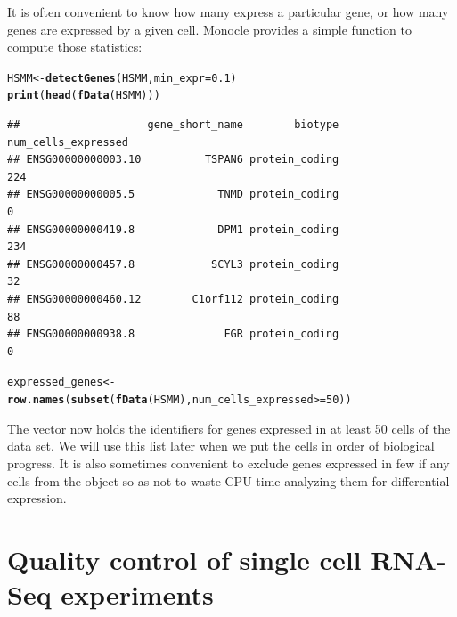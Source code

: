 \documentclass[10pt,oneside]{article}\usepackage[]{graphicx}\usepackage[]{color}
\makeatletter
\newcommand{\hlnum}[1]{\textcolor[rgb]{0.686,0.059,0.569}{#1}}%
\newcommand{\hlopt}[1]{\textcolor[rgb]{0,0,0}{#1}}%
\newcommand{\hlstd}[1]{\textcolor[rgb]{0.345,0.345,0.345}{#1}}%
\newcommand{\hlkwb}[1]{\textcolor[rgb]{0.69,0.353,0.396}{#1}}%
\newcommand{\hlkwc}[1]{\textcolor[rgb]{0.333,0.667,0.333}{#1}}%
\newcommand{\hlkwd}[1]{\textcolor[rgb]{0.737,0.353,0.396}{\textbf{#1}}}%
\newenvironment{kframe}{%
 \def\at@end@of@kframe{}%
 \ifinner\ifhmode%
  \def\at@end@of@kframe{\end{minipage}}%
  \begin{minipage}{\columnwidth}%
 \fi\fi%
 \def\FrameCommand##1{\hskip\@totalleftmargin \hskip-\fboxsep
 \colorbox{shadecolor}{##1}\hskip-\fboxsep
     \hskip-\linewidth \hskip-\@totalleftmargin \hskip\columnwidth}%
 \MakeFramed {\advance\hsize-\width
   \@totalleftmargin\z@ \linewidth\hsize
   \@setminipage}}%
 {\par\unskip\endMakeFramed%
 \at@end@of@kframe}
\newenvironment{knitrout}{}{} %
\makeatother
\begin{document}
It is often convenient to know how many express a particular gene, or how many genes are expressed by a given cell. Monocle provides a simple function to compute those statistics: 
\begin{knitrout}
\color{fgcolor}\begin{kframe}
\begin{alltt}
\hlstd{HSMM} \hlkwb{<-} \hlkwd{detectGenes}\hlstd{(HSMM,} \hlkwc{min_expr} \hlstd{=} \hlnum{0.1}\hlstd{)}
\hlkwd{print}\hlstd{(}\hlkwd{head}\hlstd{(}\hlkwd{fData}\hlstd{(HSMM)))}
\end{alltt}
\begin{verbatim}
##                    gene_short_name        biotype num_cells_expressed
## ENSG00000000003.10          TSPAN6 protein_coding                 224
## ENSG00000000005.5             TNMD protein_coding                   0
## ENSG00000000419.8             DPM1 protein_coding                 234
## ENSG00000000457.8            SCYL3 protein_coding                  32
## ENSG00000000460.12        C1orf112 protein_coding                  88
## ENSG00000000938.8              FGR protein_coding                   0
\end{verbatim}
\begin{alltt}
\hlstd{expressed_genes} \hlkwb{<-} \hlkwd{row.names}\hlstd{(}\hlkwd{subset}\hlstd{(}\hlkwd{fData}\hlstd{(HSMM), num_cells_expressed} \hlopt{>=} \hlnum{50}\hlstd{))}
\end{alltt}
\end{kframe}
\end{knitrout}


The vector  now holds the identifiers for genes expressed in at least 50 cells of the data set. We will use this list later when we put the cells in order of biological progress. It is also sometimes convenient to exclude genes expressed in few if any cells from the  object so as not to waste CPU time analyzing them for differential expression.

\section{Quality control of single cell RNA-Seq experiments}
\end{document}
